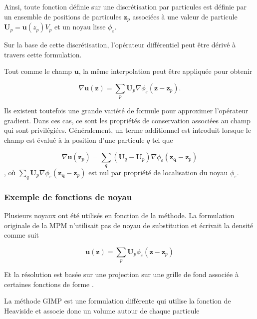 Ainsi, toute fonction définie sur une discrétisation par particules est définie par un ensemble de positions de particules $\bm{z}_p$ associées à une valeur de particule $\bm{U}_p = \bm{u}(z_p) V_p$ et un noyau lisse $\phi_\varepsilon$.

Sur la base de cette discrétisation, l'opérateur différentiel peut être dérivé à travers cette formulation.

Tout comme le champ $\bm u$, la même interpolation peut être appliquée pour obtenir

\begin{equation*}
    \nabla \bm{u}(\bm{z}) = \sum_p \bm{U}_p \nabla \phi_\varepsilon (\bm{z}-\bm{z}_p).
\end{equation*}

Ils existent toutefois une grande variété de formule pour approximer l'opérateur gradient. Dans ces cas, ce sont les propriétés de conservation associées au champ qui sont privilégiées.
Généralement, un terme additionnel est introduit lorsque le champ est évalué à la position d'une particule $q$ tel que

\begin{equation*}
    \nabla \bm{u}(\bm{z}_p) = \sum_q (\bm{U}_q - \bm{U}_p) \nabla \phi_\varepsilon (\bm{z_q}-\bm{z}_p)
\end{equation*}, où $\sum_q \bm{U}_p \nabla \phi_\varepsilon (\bm{z_q}-\bm{z}_p)$ est nul par propriété de localisation du noyau $\phi_\varepsilon$.


\subsubsection{Exemple de fonctions de noyau}

Plusieurs noyaux ont été utilisés en fonction de la méthode. La formulation originale de la MPM n'utilisait pas de noyau de substitution et écrivait la densité comme suit

\begin{equation*}
    \bm{u}(\bm{z}) = \sum_p \bm{U}_p \phi_\varepsilon (\bm{z}-\bm{z}_p)
\end{equation*}

Et la résolution est basée sur une projection sur une grille de fond associée à certaines fonctions de forme \cite{sulsky_particle_1994}.

La méthode GIMP est une formulation différente qui utilise la fonction de Heaviside \cite{bardenhagen_generalized_2004} et associe donc un volume autour de chaque particule

